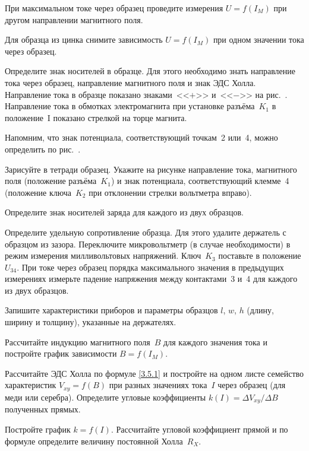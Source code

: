 \begin{lab:task}
{При максимальном токе через образец проведите измерения $U=f(I_{M})$ при другом
направлении магнитного поля.

Для образца из цинка снимите зависимость $U=f(I_{M})$ при одном значении тока
через образец.}

\item{Определите знак носителей в образце. Для этого необходимо знать
направление тока через образец, направление магнитного поля и знак ЭДС Холла.
Направление тока в образце показано знаками~<<$+$>> и~<<$-$>> на
рис.~. Направление тока в обмотках электромагнита при установке
разъёма~$K_1$ в положение~I показано стрелкой на торце магнита.

Напомним, что знак потенциала, соответствующий точкам~2 или~4, можно определить
по рис.~.

Зарисуйте в тетради образец. Укажите на рисунке направление тока, магнитного
поля (положение разъёма~$K_1$) и знак
потенциала, соответствующий клемме~4 (положение ключа~$K_2$ при отклонении
стрелки вольтметра вправо).

Определите знак носителей заряда для каждого из двух образцов.}
\item{Определите удельную сопротивление образца. Для этого удалите держатель с
образцом из зазора. Переключите микровольтметр (в случае необходимости) в режим
измерения милливольтовых напряжений. Ключ~$K_3$ поставьте в положение $U_{34}$.
При токе через образец порядка максимального значения в предыдущих измерениях
измерьте падение напряжения между контактами~3 и~4 для каждого из двух
образцов.}

\item{ Запишите характеристики приборов и параметры образцов $l$, $w$, $h$
(длину, ширину и толщину), указанные на держателях.}


\item{Рассчитайте индукцию магнитного поля~$B$ для каждого значения тока и
постройте график зависимости $B=f(I_{M})$.}

\item{Рассчитайте ЭДС Холла по формуле \eqref{3.5.1} и постройте на одном листе
семейство характеристик $V_{xy}=f(B)$ при разных значениях тока~$I$ через
образец (для меди или серебра). Определите угловые коэффициенты $k(I)=\Delta
V_{xy}/\Delta B$ полученных прямых.}

\item{ Постройте график $k=f(I)$. Рассчитайте угловой коэффициент прямой и по
формуле  определите величину постоянной Холла~$R_X$.

}
\end{lab:task}

